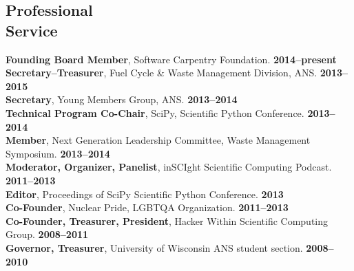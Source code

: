 \documentclass[margin,line]{resume}
\begin{document}
\begin{resume}
    \section{\mysidestyle Professional\\Service}
		\textbf{Founding Board Member}, Software Carpentry Foundation. \hfill \textbf{2014--present}\vspace{.5mm}\\%
		\textbf{Secretary--Treasurer}, Fuel Cycle \& Waste Management Division, ANS. \hfill \textbf{2013--2015}\vspace{.5mm}\\%
		\textbf{Secretary}, Young Members Group, ANS. \hfill \textbf{2013--2014}\vspace{.5mm}\\%
		\textbf{Technical Program Co-Chair}, SciPy, Scientific Python Conference.  \hfill \textbf{2013--2014}\vspace{.5mm}\\%
		\textbf{Member}, Next Generation Leadership Committee, Waste Management Symposium. \hfill \textbf{2013--2014}\vspace{.5mm}\\%
		\textbf{Moderator, Organizer, Panelist}, inSCIght Scientific Computing Podcast. \hfill \textbf{2011--2013}\vspace{.5mm}\\%
		\textbf{Editor}, Proceedings of SciPy Scientific Python Conference.  \hfill \textbf{2013}\vspace{.5mm}\\%
		\textbf{Co-Founder}, Nuclear Pride, LGBTQA Organization. \hfill \textbf{2011--2013}\vspace{.5mm}\\%
		\textbf{Co-Founder, Treasurer, President}, Hacker Within Scientific Computing Group. \hfill \textbf{2008--2011}\vspace{.5mm}\\%
		\textbf{Governor, Treasurer}, University of Wisconsin ANS student section. \hfill \textbf{2008--2010}\vspace{.5mm}\\%


\end{resume}
\end{document}
